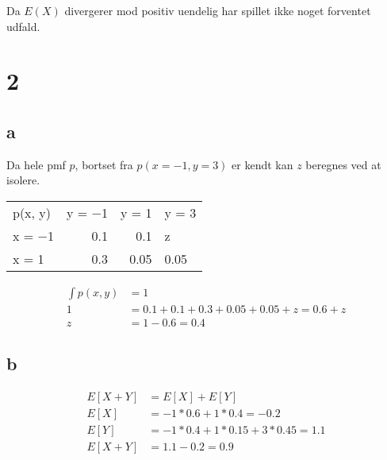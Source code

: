 \documentclass[11pt]{article}
\begin{document}
Da \(E(X)\) divergerer mod positiv uendelig har spillet ikke noget forventet udfald.
\section{2}
\label{sec:orgae2e124}
\subsection{a}
\label{sec:org2e4b348}
Da hele pmf \(p\), bortset fra \(p(x=-1,y=3)\) er kendt kan \(z\) beregnes ved at isolere.

\begin{center}
\begin{tabular}{lrrl}
p(x, y) & y = −1 & y = 1 & y = 3\\
x = −1 & 0.1 & 0.1 & z\\
x = 1 & 0.3 & 0.05 & 0.05\\
\end{tabular}
\end{center}

\begin{align}
\int p(x,y) &= 1 \\
1 &= 0.1 + 0.1 + 0.3 + 0.05 + 0.05 + z = 0.6 + z \\
z &= 1 - 0.6 = 0.4
\end{align}
\subsection{b}
\label{sec:orgacaf8ef}
\begin{align}
E[X+Y] &= E[X] + E[Y] \\
E[X] &= -1*0.6 + 1*0.4 = -0.2 \\
E[Y] &= -1*0.4 + 1*0.15 + 3*0.45 = 1.1 \\
E[X+Y] &= 1.1 - 0.2 = 0.9
\end{align}
\end{document}
